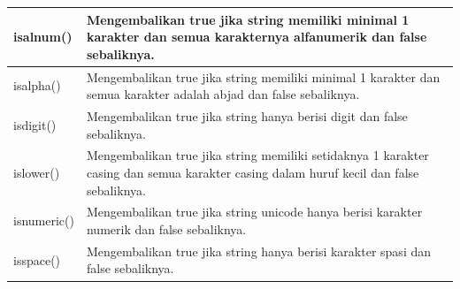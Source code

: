 \begin{center}
\begin{tabular}{ | m{3cm} | m{7cm} | }
\hline
isalnum() & Mengembalikan true jika string memiliki minimal 1 karakter dan semua karakternya alfanumerik dan false sebaliknya. \\
\hline
isalpha() & Mengembalikan true jika string memiliki minimal 1 karakter dan semua karakter adalah abjad dan false sebaliknya. \\
\hline
isdigit() & Mengembalikan true jika string hanya berisi digit dan false sebaliknya. \\
\hline
islower() & Mengembalikan true jika string memiliki setidaknya 1 karakter casing dan semua karakter casing dalam huruf kecil dan false sebaliknya. \\
\hline
isnumeric() & Mengembalikan true jika string unicode hanya berisi karakter numerik dan false sebaliknya. \\
\hline
isspace() & Mengembalikan true jika string hanya berisi karakter spasi dan false sebaliknya. \\
\hline
\end{tabular}
\end{center}

